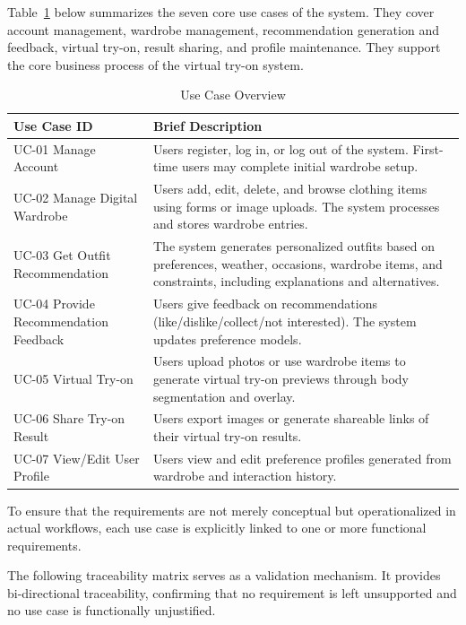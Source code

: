 \newpage
Table~\ref{tab:uc_overview} below summarizes the seven core use cases of the system. They cover account management, wardrobe management, recommendation generation and feedback, virtual try-on, result sharing, and profile maintenance. They support the core business process of the virtual try-on system.
\begin{table}[H]
\centering
\caption{Use Case Overview}
\label{tab:uc_overview}
\renewcommand{\arraystretch}{1.5}
\begin{tabular}{p{4cm} p{12cm}}
\toprule
\textbf{Use Case ID} & \textbf{Brief Description} \\
\midrule
UC-01 Manage Account &
Users register, log in, or log out of the system. First-time users may complete initial wardrobe setup. \\
UC-02 Manage Digital Wardrobe &
Users add, edit, delete, and browse clothing items using forms or image uploads. The system processes and stores wardrobe entries. \\
UC-03 Get Outfit Recommendation &
The system generates personalized outfits based on preferences, weather, occasions, wardrobe items, and constraints, including explanations and alternatives. \\
UC-04 Provide Recommendation Feedback &
Users give feedback on recommendations (like/dislike/collect/not interested). The system updates preference models. \\
UC-05 Virtual Try-on &
Users upload photos or use wardrobe items to generate virtual try-on previews through body segmentation and overlay. \\
UC-06 Share Try-on Result &
Users export images or generate shareable links of their virtual try-on results. \\
UC-07 View/Edit User Profile &
Users view and edit preference profiles generated from wardrobe and interaction history. \\
\bottomrule
\end{tabular}
\end{table}


\newpage
To ensure that the requirements are not merely conceptual but operationalized in actual workflows, each use case is explicitly linked to one or more functional requirements.

The following traceability matrix serves as a validation mechanism. It provides bi-directional traceability, confirming that no requirement is left unsupported and no use case is functionally unjustified.

